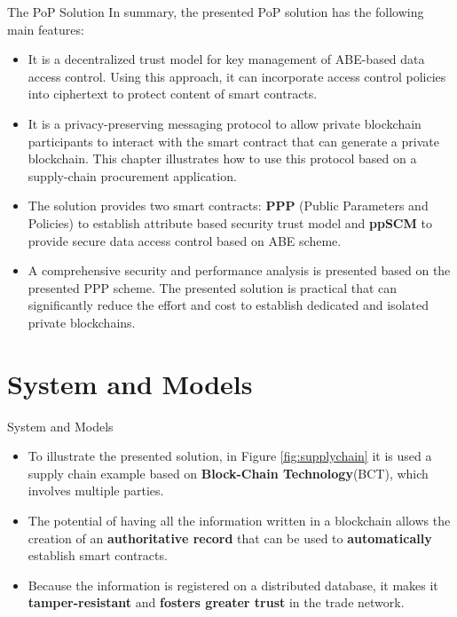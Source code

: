 \documentclass[11pt]{beamer}
\begin{document}
\begin{frame}[allowframebreaks]{The PoP Solution}
In summary, the presented PoP solution has the following main features:
\begin{itemize}
	\item It is a decentralized trust model for key management of ABE-based data access control. Using this approach, it can incorporate access control policies into ciphertext to protect content of smart contracts.
	\item It is a privacy-preserving messaging protocol to allow private blockchain participants to interact with the smart contract that can generate a private blockchain. This chapter illustrates how to use this protocol based on a supply-chain procurement application.
	\item The solution provides two smart contracts: \textbf{PPP} (Public Parameters and Policies) to establish attribute based security trust model and \textbf{ppSCM} to provide secure data access control based on ABE scheme.
	\item A comprehensive security and performance analysis is presented based on the presented PPP scheme. The presented solution is practical that can significantly reduce the effort and cost to establish dedicated and isolated private blockchains.


\end{itemize}

\end{frame}

\section{System and Models}
\begin{frame}{System and Models}
\begin{itemize}
	\item To illustrate the presented solution, in Figure \ref{fig:supplychain} it is used a supply chain example based on \textbf{Block-Chain Technology}(BCT), which involves multiple parties.
	\item The potential of having all the information written in a blockchain allows the creation of an \textbf{authoritative record} that can be used to \textbf{automatically} establish smart contracts.
	\item Because the information is registered on a distributed database, it makes it \textbf{tamper-resistant} and \textbf{fosters greater trust} in the trade network.
\end{itemize}
\end{frame}
\end{document}
